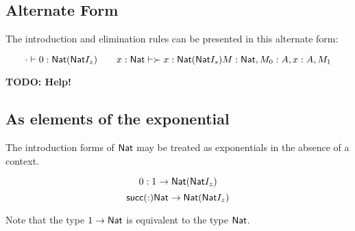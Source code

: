 \documentclass[11pt]{article}
\newcommand*{\z}{0}
\newcommand*{\s}[1]{\mathsf{succ}(#1)}
\begin{document}
\subsection{Alternate Form}
The introduction and elimination rules can be presented in this alternate form:

\[
\cdot \entails \z : \Nat ({\Nat}I_z)

\qquad
\hfill

x: \Nat \entails \succ{x} : \Nat ({\Nat}I_s)

\\[4ex]

M: \Nat, M_0: A, x: A, M_1
\]

\textbf{TODO: Help!}

\subsection{As elements of the exponential}
The introduction forms of $\mathsf{Nat}$ may be treated as exponentials in the absence
of a context.

\[\z : 1 \to \Nat ({\Nat}I_z)\]
\[\s : \Nat \to \Nat ({\Nat}I_z)\]

Note that the type $1 \to \mathsf{Nat}$ is equivalent to the type $\mathsf{Nat}$.
\end{document}
